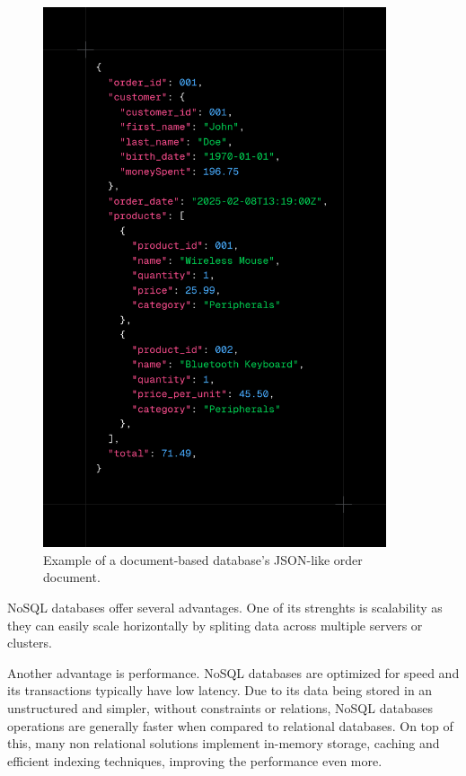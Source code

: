 \begin{figure}[htbp]
	\centering
	\includegraphics[width=0.9\textwidth, height=0.5\textheight, keepaspectratio]{Chapters/Figures/Databases/NoSQL.png}
	\caption{Example of a document-based database's \gls{JSON}-like order document.}
	\label{fig:databases:NoSQL}
\end{figure}

\gls{NoSQL} databases offer several advantages. One of its strenghts is scalability
as they can easily scale horizontally by spliting data across
multiple servers or clusters.

Another advantage is performance. \gls{NoSQL} databases are optimized for speed
and its transactions typically have low latency. Due to its data being stored
in an unstructured and simpler, without constraints or relations, \gls{NoSQL}
databases operations are generally faster when compared to relational databases.
On top of this, many non relational solutions implement in-memory storage,
caching and efficient indexing techniques, improving the performance even more.

